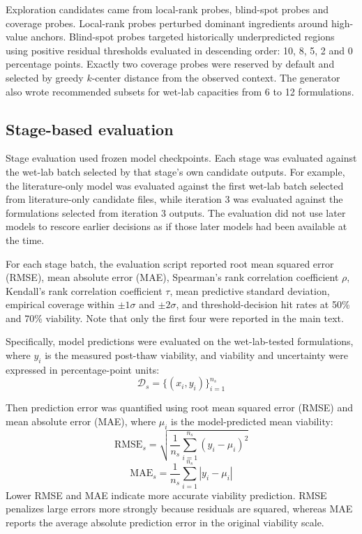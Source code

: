 \documentclass[preprint,12pt]{elsarticle}
\begin{document}
Exploration candidates came from local-rank probes, blind-spot probes and coverage probes. Local-rank probes perturbed dominant ingredients around high-value anchors. Blind-spot probes targeted historically underpredicted regions using positive residual thresholds evaluated in descending order: 10, 8, 5, 2 and 0 percentage points. Exactly two coverage probes were reserved by default and selected by greedy \(k\)-center distance from the observed context. The generator also wrote recommended subsets for wet-lab capacities from 6 to 12 formulations.

\subsection{Stage-based evaluation}

Stage evaluation used frozen model checkpoints. Each stage was evaluated against the wet-lab batch selected by that stage's own candidate outputs. For example, the literature-only model was evaluated against the first wet-lab batch selected from literature-only candidate files, while iteration 3 was evaluated against the formulations selected from iteration 3 outputs. The evaluation did not use later models to rescore earlier decisions as if those later models had been available at the time.

For each stage batch, the evaluation script reported root mean squared error (RMSE), mean absolute error (MAE), Spearman's rank correlation coefficient \(\rho\), Kendall's rank correlation coefficient \(\tau\), mean predictive standard deviation, empirical coverage within \(\pm 1\sigma\) and \(\pm 2\sigma\), and threshold-decision hit rates at 50\% and 70\% viability. Note that only the first four were reported in the main text.

Specifically, model predictions were evaluated on the wet-lab-tested formulations, where \(y_i\) is the measured post-thaw viability, and viability and uncertainty were expressed in percentage-point units:
\begin{equation}
\mathcal{D}_{s}=\{(x_i,y_i)\}_{i=1}^{n_s}
\end{equation}

Then prediction error was quantified using root mean squared error (RMSE) and mean absolute error (MAE), where \(\mu_i\) is the model-predicted mean viability:
\begin{equation}
\mathrm{RMSE}_{s}=\sqrt{\frac{1}{n_s}\sum_{i=1}^{n_s}(y_i-\mu_i)^2}
\end{equation}
\begin{equation}
\mathrm{MAE}_{s}=\frac{1}{n_s}\sum_{i=1}^{n_s}|y_i-\mu_i|
\end{equation}
Lower RMSE and MAE indicate more accurate viability prediction. RMSE penalizes large errors more strongly because residuals are squared, whereas MAE reports the average absolute prediction error in the original viability scale.
\end{document}
